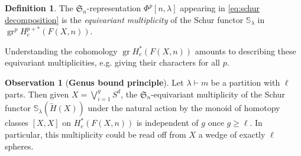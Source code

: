 \documentclass[12pt]{article}
\newcommand{\SymGroup}[1][n]{\mathfrak{S}_{#1}}
\newcommand{\Schur}[1]{\mathbb{S}_{#1}}
\DeclareMathOperator{\gr}{gr}
\theoremstyle{plain}
\theoremstyle{definition}
\newtheorem{defi}[thm]{Definition}
\newtheorem{observation}[thm]{Observation}
\theoremstyle{remark}
\begin{document}
\begin{defi}
The $\SymGroup$-representation $\Phi^p[n,\lambda]$ appearing in \eqref{eq:schur decomposition} is the \emph{equivariant multiplicity} of the Schur functor $\Schur{\lambda}$ in $\gr^p H^{p+*}_c(F(X,n))$.
\end{defi}

Understanding the cohomology $\gr H^*_c(F(X,n))$ amounts to describing these equivariant multiplicities, e.g. giving their characters for all $p$.

\begin{observation}[\textbf{Genus bound principle}]\label{lem:genus bound}
    Let $\lambda\vdash m$ be a partition with $\ell$ parts. Then given $X = \bigvee_{i=1}^g S^d$, the $\SymGroup$-equivariant multiplicity of the Schur functor $\Schur{\lambda}(\tilde{H}(X))$ 
    under the natural action by the monoid of homotopy classes $[X,X]$ on $H_c^{*}(F(X, n))$ is independent of $g$ once $g\geq \ell$. In particular, this multiplicity could be read off from $X$ a wedge of exactly $\ell$ spheres.
\end{observation} 
\end{document}
